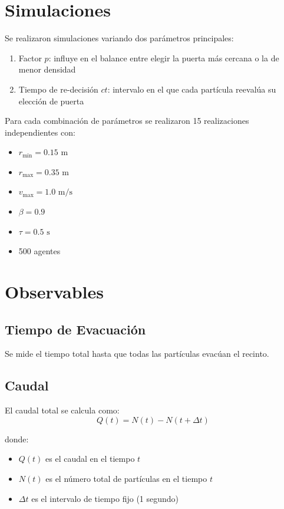 \documentclass[12pt]{article}
\begin{document}
\section{Simulaciones}
Se realizaron simulaciones variando dos parámetros principales:

\begin{enumerate}
    \item Factor $p$: influye en el balance entre elegir la puerta más cercana o la de menor densidad
    \item Tiempo de re-decisión $ct$: intervalo en el que cada partícula reevalúa su elección de puerta
\end{enumerate}

Para cada combinación de parámetros se realizaron 15 realizaciones independientes con:
\begin{itemize}
    \item $r_{\text{min}} = 0.15\text{ m}$
    \item $r_{\text{max}} = 0.35\text{ m}$
    \item $v_{\text{max}} = 1.0\text{ m/s}$
    \item $\beta = 0.9$
    \item $\tau = 0.5\text{ s}$
    \item 500 agentes
\end{itemize}

\section{Observables}

\subsection{Tiempo de Evacuación}
Se mide el tiempo total hasta que todas las partículas evacúan el recinto.

\subsection{Caudal}
El caudal total se calcula como:
\begin{equation}
Q(t) = N(t) - N(t + \Delta t)
\end{equation}

donde:
\begin{itemize}
    \item $Q(t)$ es el caudal en el tiempo $t$
    \item $N(t)$ es el número total de partículas en el tiempo $t$
    \item $\Delta t$ es el intervalo de tiempo fijo (1 segundo)
\end{itemize}
\end{document}
